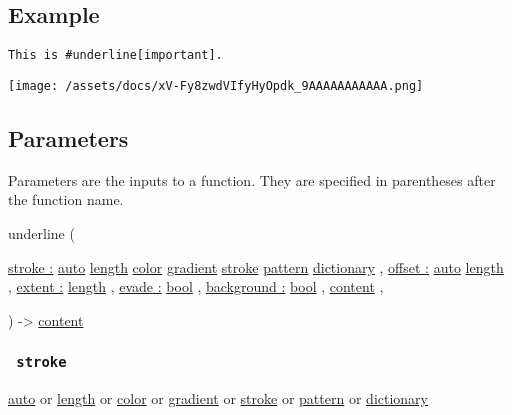 \subsection{Example}\label{example}

\begin{verbatim}
This is #underline[important].
\end{verbatim}

\texttt{[image: /assets/docs/xV-Fy8zwdVIfyHyOpdk\_9AAAAAAAAAAA.png]}

\subsection{\texorpdfstring{{ Parameters
}}{ Parameters }}\label{parameters}

\label{parameters-tooltip}
Parameters are the inputs to a function. They are specified in
parentheses after the function name.

{ underline } (

{ \hyperref[parameters-stroke]{stroke :}
\href{/docs/reference/foundations/auto/}{auto}
\href{/docs/reference/layout/length/}{length}
\href{/docs/reference/visualize/color/}{color}
\href{/docs/reference/visualize/gradient/}{gradient}
\href{/docs/reference/visualize/stroke/}{stroke}
\href{/docs/reference/visualize/pattern/}{pattern}
\href{/docs/reference/foundations/dictionary/}{dictionary} , } {
\hyperref[parameters-offset]{offset :}
\href{/docs/reference/foundations/auto/}{auto}
\href{/docs/reference/layout/length/}{length} , } {
\hyperref[parameters-extent]{extent :}
\href{/docs/reference/layout/length/}{length} , } {
\hyperref[parameters-evade]{evade :}
\href{/docs/reference/foundations/bool/}{bool} , } {
\hyperref[parameters-background]{background :}
\href{/docs/reference/foundations/bool/}{bool} , } {
\href{/docs/reference/foundations/content/}{content} , }

) -\textgreater{} \href{/docs/reference/foundations/content/}{content}

\subsubsection{\texorpdfstring{\texttt{\ stroke\ }}{ stroke }}\label{parameters-stroke}

\href{/docs/reference/foundations/auto/}{auto} {or}
\href{/docs/reference/layout/length/}{length} {or}
\href{/docs/reference/visualize/color/}{color} {or}
\href{/docs/reference/visualize/gradient/}{gradient} {or}
\href{/docs/reference/visualize/stroke/}{stroke} {or}
\href{/docs/reference/visualize/pattern/}{pattern} {or}
\href{/docs/reference/foundations/dictionary/}{dictionary}

